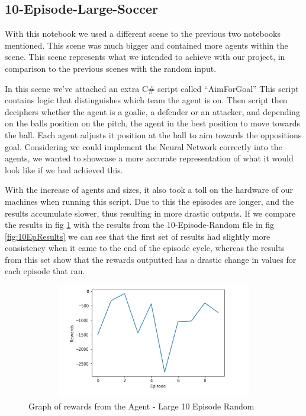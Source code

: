 \subsection{10-Episode-Large-Soccer}
With this notebook we used a different scene to the previous two notebooks mentioned. This scene was much bigger and contained more agents within the scene. This scene represents what we intended to achieve with our project, in comparison to the previous scenes with the random input. 

In this scene we’ve attached an extra C\# script called “AimForGoal” This script contains logic that distinguishes which team the agent is on. Then script then deciphers whether the agent is a goalie, a defender or an attacker, and depending on the balls position on the pitch, the agent in the best position to move towards the ball. Each agent adjusts it position at the ball to aim towards the oppositions goal. Considering we could implement the Neural Network correctly into the agents, we wanted to showcase a more accurate representation of what it would look like if we had achieved this. 

With the increase of agents and sizes, it also took a toll on the hardware of our machines when running this script. Due to this the episodes are longer, and the results accumulate slower, thus resulting in more drastic outputs. If we compare the results in fig \ref{fig:10EpLarge} with the results from the 10-Episode-Random file in fig \ref{fig:10EpResults} we can see that the first set of results had slightly more consistency when it came to the end of the episode cycle, whereas the results from this set show that the rewards outputted has a drastic change in values for each episode that ran. 

\begin{figure}[H]
    \centering
    \includegraphics[width=120mm, height=50mm]{img/Large10Episode.PNG}
    \caption{Graph of rewards from the Agent - Large 10 Episode Random}
    \label{fig:10EpLarge}
\end{figure}

